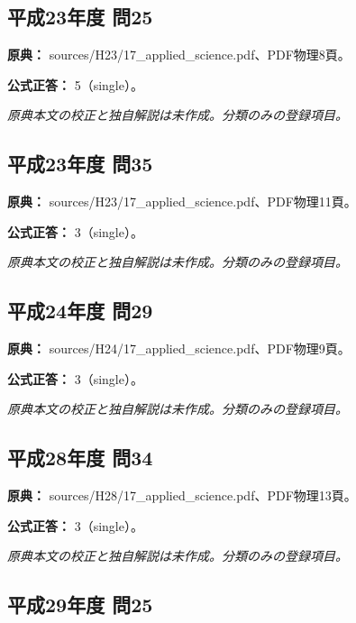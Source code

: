 \subsection{平成23年度 問25}
\label{q:h23-reg-applied-25}

\noindent\textbf{原典：} sources/H23/17\_applied\_science.pdf、PDF物理8頁。

\textbf{公式正答：} 5（single）。

\par\textit{原典本文の校正と独自解説は未作成。分類のみの登録項目。}

\subsection{平成23年度 問35}
\label{q:h23-reg-applied-35}

\noindent\textbf{原典：} sources/H23/17\_applied\_science.pdf、PDF物理11頁。

\textbf{公式正答：} 3（single）。

\par\textit{原典本文の校正と独自解説は未作成。分類のみの登録項目。}

\subsection{平成24年度 問29}
\label{q:h24-reg-applied-29}

\noindent\textbf{原典：} sources/H24/17\_applied\_science.pdf、PDF物理9頁。

\textbf{公式正答：} 3（single）。

\par\textit{原典本文の校正と独自解説は未作成。分類のみの登録項目。}

\subsection{平成28年度 問34}
\label{q:h28-reg-applied-34}

\noindent\textbf{原典：} sources/H28/17\_applied\_science.pdf、PDF物理13頁。

\textbf{公式正答：} 3（single）。

\par\textit{原典本文の校正と独自解説は未作成。分類のみの登録項目。}

\subsection{平成29年度 問25}
\label{q:h29-reg-applied-25}

